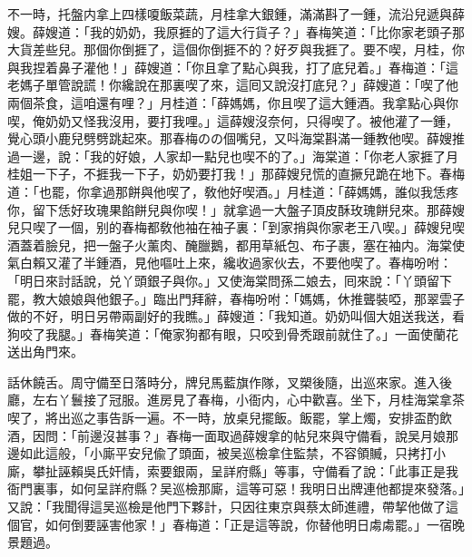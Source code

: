 不一時，托盤内拿上四樣嗄飯菜蔬，月桂拿大銀鍾，滿滿斟了一鍾，流沿兒遞與薛嫂。薛嫂道：「我的奶奶，我原捱的了這大行貨子？」春梅笑道：「比你家老頭子那大貨差些兒。那個你倒捱了，這個你倒捱不的？好歹與我捱了。要不喫，月桂，你與我捏着鼻子灌他！」薛嫂道：「你且拿了點心與我，打了底兒着。」春梅道：「這老媽子單管說謊！你纔說在那裏喫了來，這囘又說沒打底兒？」薛嫂道：「喫了他兩個茶食，這咱還有哩？」月桂道：「薛媽媽，你且喫了這大鍾酒。我拿點心與你喫，俺奶奶又怪我沒用，要打我哩。」這薛嫂沒奈何，只得喫了。被他灌了一鍾，覺心頭小鹿兒劈劈跳起來。那春梅のの個嘴兒，又呌海棠斟滿一鍾教他喫。薛嫂推過一邊，說：「我的好娘，人家却一點兒也喫不的了。」海棠道：「你老人家捱了月桂姐一下子，不捱我一下子，奶奶要打我！」那薛嫂兒慌的直撅兒跪在地下。春梅道：「也罷，你拿過那餅與他喫了，敎他好喫酒。」月桂道：「薛媽媽，誰似我恁疼你，留下恁好玫瑰果餡餅兒與你喫！」就拿過一大盤子頂皮酥玫瑰餅兒來。那薛嫂兒只喫了一個，别的春梅都敎他袖在袖子裏：「到家捎與你家老王八喫。」薛嫂兒喫酒蓋着臉兒，把一盤子火薰肉、醃臘鵝，都用草紙包、布子裹，塞在袖内。海棠使氣白賴又灌了半鍾酒，見他嘔吐上來，纔收過家伙去，不要他喫了。春梅吩咐：「明日來討話說，兑丫頭銀子與你。」又使海棠問孫二娘去，囘來說：「丫頭留下罷，教大娘娘與他銀子。」臨出門拜辭，春梅吩咐：「媽媽，休推聾裝啞，那翠雲子做的不好，明日另帶兩副好的我瞧。」薛嫂道：「我知道。奶奶叫個大姐送我送，看狗咬了我腿。」春梅笑道：「俺家狗都有眼，只咬到骨秃跟前就住了。」一面使蘭花送出角門來。

話休饒舌。周守備至日落時分，牌兒馬藍旗作隊，叉槊後隨，出巡來家。進入後廳，左右丫鬟接了冠服。進房見了春梅，小衙内，心中歡喜。坐下，月桂海棠拿茶喫了，將出巡之事告訴一遍。不一時，放桌兒擺飯。飯罷，掌上燭，安排盃酌飲酒，因問：「前邊沒甚事？」春梅一面取過薛嫂拿的帖兒來與守備看，說吴月娘那邊如此這般，「小廝平安兒偸了頭面，被吴巡檢拿住監禁，不容領贓，只拷打小廝，攀扯誣賴吳氏奸情，索要銀兩，呈詳府縣」等事，守備看了說：「此事正是我衙門裏事，如何呈詳府縣？吴巡檢那廝，這等可惡！我明日出牌連他都提來發落。」又說：「我聞得這吴巡檢是他門下夥計，只因往東京與蔡太師進禮，帶挈他做了這個官，如何倒要誣害他家！」春梅道：「正是這等說，你替他明日䖏䖏罷。」一宿晚景題過。


